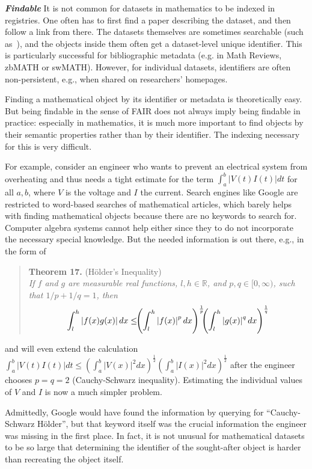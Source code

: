 \textbf{\emph{Findable}}
It is not common for datasets in mathematics to be indexed in registries.
One often has to first find a paper describing the dataset, and then follow a link from there.
The datasets themselves are sometimes searchable (such as~\cite{OEIS:on, hog}),
and the objects inside them often get a dataset-level unique identifier.
This is particularly successful for bibliographic metadata (e.g. in Math Reviews, zbMATH or swMATH).
However, for individual datasets, identifiers are often non-persistent, e.g., when shared on researchers' homepages.

Finding a mathematical object by its identifier or metadata is theoretically easy.
But being findable in the sense of FAIR does not always imply being findable in practice:
especially in mathematics, it is much more important to find objects by their semantic properties rather than by their identifier.
The indexing necessary for this is very difficult.

For example, consider an engineer who wants to prevent an electrical system from overheating and thus needs a tight estimate for the term $\int_a^b |V(t)I(t)| dt$ for all $a,b$, where $V$ is the voltage and $I$ the current.
Search engines like Google are restricted to word-based searches of mathematical articles, which barely helps with finding mathematical objects because there are no keywords to search for.
Computer algebra systems cannot help either since they to do not incorporate the necessary special knowledge.
But the needed information is out there, e.g., in the form of
\begin{quote}
  \textbf{Theorem 17.} (H\"older's Inequality)\\\it
  If $f$ and $g$ are measurable real functions, $l,h\in\mathbb{R}$, and  $p,q\in
  [0,\infty)$, such that $1/p + 1/q = 1$, then 
  \begin{equation}\label{eq:hi}
  \int_l^h \left|f(x)g(x)\right| dx \leq\kern-.4em 
    \left(\int_l^h\left|f(x)\right|^p dx\right)^\frac{1}{p} 
    \kern-.5em
    \left(\int_l^h\left|g(x)\right|^q dx \right)^\frac{1}{q}
  \end{equation}
\end{quote}
and will even extend the calculation
$\int_a^b |V(t)I(t)| dt\leq\left(\int_a^b\left|V(x)\right|^2 dx\right)^{\frac12}
\left(\int_a^b\left|I(x)\right|^2 dx\right)^{\frac12}$
after the engineer chooses $p=q=2$ (Cauchy-Schwarz inequality).
Estimating the individual values of $V$ and $I$ is now a much simpler problem.

Admittedly, Google would have found the information by querying for ``Cauchy-Schwarz H\"older'', but that keyword itself was the crucial information the engineer was missing in the first place. 
In fact, it is not unusual for mathematical datasets to be so large that determining the identifier of the sought-after object is harder than recreating the object itself.
\medskip


